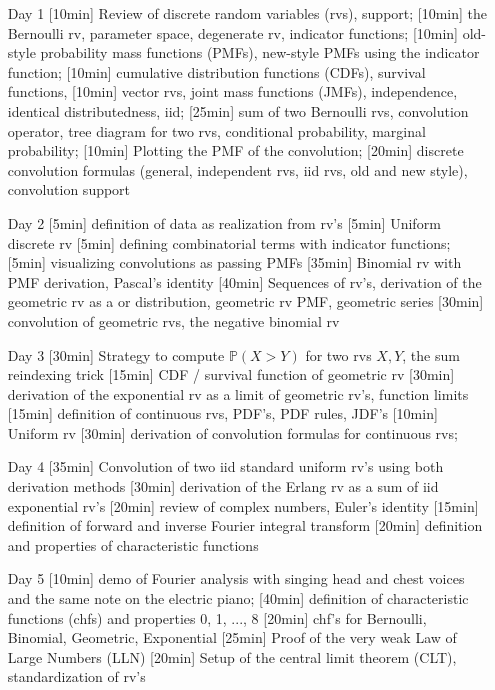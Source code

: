 \begin{enumerate}
\item[Day 1] [10min] Review of discrete random variables (rvs), support; [10min] the Bernoulli rv, parameter space, degenerate rv, indicator functions; [10min] old-style probability mass functions (PMFs), new-style PMFs using the indicator function; [10min] cumulative distribution functions (CDFs), survival functions, [10min] vector rvs, joint mass functions (JMFs), independence, identical distributedness, iid; [25min] sum of two Bernoulli rvs, convolution operator, tree diagram for two rvs, conditional probability, marginal probability; [10min] Plotting the PMF of the convolution; [20min] discrete convolution formulas (general, independent rvs, iid rvs, old and new style), convolution support

\item[Day 2] [5min] definition of data as realization from rv's [5min] Uniform discrete rv  [5min] defining combinatorial terms with indicator functions; [5min] visualizing convolutions as passing PMFs  [35min] Binomial rv with PMF derivation, Pascal's identity [40min] Sequences of rv's, derivation of the geometric rv as a  or  distribution, geometric rv PMF, geometric series [30min] convolution of geometric rvs, the negative binomial rv

\item[Day 3] [30min] Strategy to compute $\mathbb{P}(X > Y)$ for two rvs $X, Y$, the sum reindexing trick [15min] CDF / survival function of geometric rv [30min] derivation of the exponential rv as a limit of geometric rv's, function limits [15min] definition of continuous rvs, PDF's, PDF rules, JDF's [10min] Uniform rv [30min] derivation of convolution formulas for continuous rvs;

\item[Day 4] [35min] Convolution of two iid standard uniform rv's using both derivation methods [30min] derivation of the Erlang rv as a sum of iid exponential rv's [20min] review of complex numbers, Euler's identity  [15min] definition of forward and inverse Fourier integral transform [20min] definition and properties of characteristic functions  
 
\item[Day 5] [10min] demo of Fourier analysis with singing head and chest voices and the same note on the electric piano; [40min] definition of characteristic functions (chfs) and properties 0, 1, ..., 8 [20min] chf's for Bernoulli, Binomial, Geometric, Exponential [25min] Proof of the very weak Law of Large Numbers (LLN) [20min] Setup of the central limit theorem (CLT), standardization of rv's


\end{enumerate}
